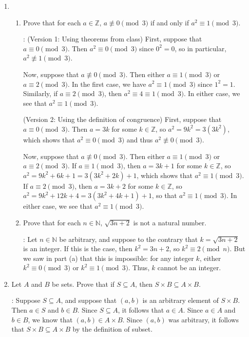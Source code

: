 \documentclass[12pt]{article}
\newcommand{\points}[1]{\marginpar{\hspace{24pt}[#1]}}
\newcommand{\Z}{\mathbb{Z}}
\newcommand{\N}{\mathbb{N}}
\newcommand{\modd}[3]{#1\equiv #2 \pmod{#3}}
\begin{document}
\thispagestyle{fancy}

 \begin{enumerate}
 \item \begin{enumerate}
 \item Prove that for each $a\in\Z$, $a\not\equiv 0\pmod{3}$ if and only if $\modd{a^2}{1}{3}$.\points{4}

\bigskip

: (Version 1: Using theorems from class) First, suppose that $\modd{a}{0}{3}$. Then $\modd{a^2}{0}{3}$ since $0^2=0$, so in particular, $a^2\not\equiv 1\pmod{3}$.

Now, suppose that $a\not\equiv 0\pmod{3}$. Then either $\modd{a}{1}{3}$ or $\modd{a}{2}{3}$. In the first case, we have $\modd{a^2}{1}{3}$ since $1^2=1$. Similarly, if $\modd{a}{2}{3}$, then $a^2\equiv 4\equiv 1 \pmod{3}$. In either case, we see that $\modd{a^2}{1}{3}$.

\bigskip

(Version 2: Using the definition of congruence) First, suppose that $\modd{a}{0}{3}$. Then $a=3k$ for some $k\in\Z$, so $a^2 = 9k^2 = 3(3k^2)$, which shows that $\modd{a^2}{0}{3}$ and thus $a^2\not\equiv 0\pmod{3}$.

Now, suppose that $a\not\equiv 0\pmod{3}$. Then either $\modd{a}{1}{3}$ or $\modd{a}{2}{3}$. If $\modd{a}{1}{3}$, then $a=3k+1$ for some $k\in \Z$, so $a^2 = 9k^2+6k+1 = 3(3k^2+2k)+1$, which shows that $\modd{a^2}{1}{3}$. If $\modd{a}{2}{3}$, then $a=3k+2$ for some $k\in\Z$, so $a^2=9k^2+12k+4 = 3(3k^2+4k+1)+1$, so that $\modd{a^2}{1}{3}$.  In either case, we see that $\modd{a^2}{1}{3}$.

\bigskip

 \item Prove that for each $n\in\N$, $\sqrt{3n+2}$ is not a natural number. \points{2}

\bigskip

: Let $n\in\N$ be arbitrary, and suppose to the contrary that $k=\sqrt{3n+2}$ is an integer. If this is the case, then $k^2=3n+2$, so $\modd{k^2}{2}{n}$. But we saw in part (a) that this is impossible: for any integer $k$, either $\modd{k^2}{0}{3}$ or $\modd{k^2}{1}{3}$. Thus, $k$ cannot be an integer.
\end{enumerate}


\item Let $A$ and $B$ be sets. Prove that if $S\subseteq A$, then $S\times B\subseteq A\times B$.\points{4}

\bigskip

: Suppose $S\subseteq A$, and suppose that $(a,b)$ is an arbitrary element of $S\times B$. Then $a\in S$ and $b\in B$. Since $S\subseteq A$, it follows that $a\in A$. Since $a\in A$ and $b\in B$, we know that $(a,b)\in A\times B$. Since $(a,b)$ was arbitrary, it follows that $S\times B\subseteq A\times B$ by the definition of subset.
 \end{enumerate}
\end{document}
